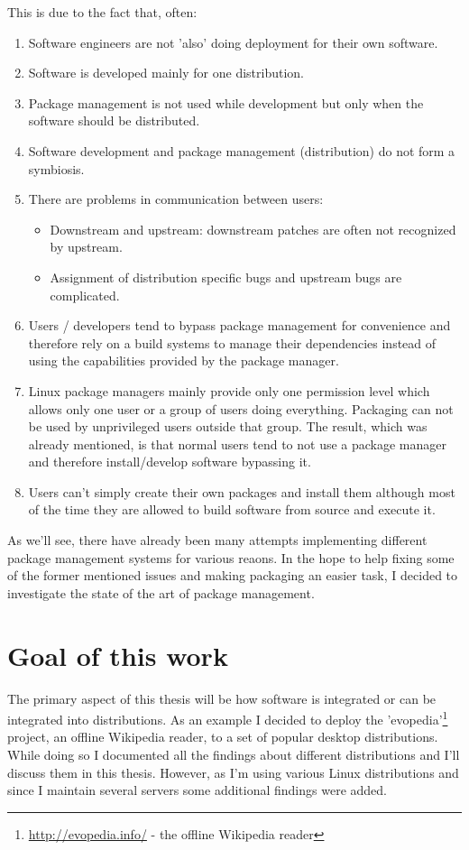 \documentclass[a4paper,10pt]{article}
\begin{document}
This is due to the fact that, often:
\begin{enumerate}
\item Software engineers are not 'also' doing deployment for their own software.
\item Software is developed mainly for one distribution.
\item Package management is not used while development but only when the software should be distributed.
\item Software development and package management (distribution) do not form a symbiosis.
\item There are problems in communication between users:
\begin{itemize}
\item Downstream and upstream: downstream patches are often not recognized by upstream.
\item Assignment of distribution specific bugs and upstream bugs are complicated.
\end{itemize}
\item Users / developers tend to bypass package management for convenience and therefore rely on a build systems to manage their dependencies instead of using the capabilities provided by the package manager.
\item Linux package managers mainly provide only one permission level which allows only one user or a group of users doing everything. Packaging can not be used by unprivileged users outside that group. The result, which was already mentioned, is that normal users tend to not use a package manager and therefore install/develop software bypassing it.

\item Users can't simply create their own packages and install them although most of the time they are allowed to build software from source and execute it.

\end{enumerate}

As we'll see, there have already been many attempts implementing different package management systems for various reaons. 
In the hope to help fixing some of the former mentioned issues and making packaging an easier task, I decided to investigate the state of the art of package management.

\section{Goal of this work}
The primary aspect of this thesis will be how software is integrated or can be integrated into distributions. As an example I decided to deploy the 'evopedia'\footnote{\url{http://evopedia.info/} - the offline Wikipedia reader} project, an offline Wikipedia reader, to a set of popular desktop distributions. While doing so I documented all the findings about different distributions and I'll discuss them in this thesis. However, as I'm using various Linux distributions and since I maintain several servers some additional findings were added.
\end{document}
